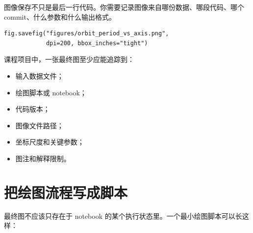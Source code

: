 图像保存不只是最后一行代码。你需要记录图像来自哪份数据、哪段代码、哪个 commit、什么参数和什么输出格式。

\begin{examplebox}[保存图像]
\begin{lstlisting}[style=pythonstyle]
fig.savefig("figures/orbit_period_vs_axis.png",
            dpi=200, bbox_inches="tight")
\end{lstlisting}
\end{examplebox}

课程项目中，一张最终图至少应能追踪到：

\begin{itemize}
    \item 输入数据文件；
    \item 绘图脚本或 notebook；
    \item 代码版本；
    \item 图像文件路径；
    \item 坐标尺度和关键参数；
    \item 图注和解释限制。
\end{itemize}

\section{把绘图流程写成脚本}

最终图不应该只存在于 notebook 的某个执行状态里。一个最小绘图脚本可以长这样：

